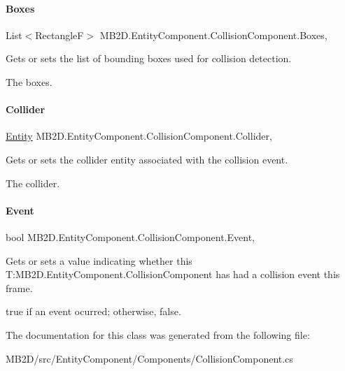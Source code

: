 \paragraph{\texorpdfstring{Boxes}{Boxes}}
{\footnotesize\ttfamily List$<$RectangleF$>$ M\+B2\+D.\+Entity\+Component.\+Collision\+Component.\+Boxes\hspace{0.3cm}{\ttfamily [get]}, {\ttfamily [set]}}



Gets or sets the list of bounding boxes used for collision detection. 

The boxes.\hypertarget{class_m_b2_d_1_1_entity_component_1_1_collision_component_aac8e61b6e669a4451fb2e8859827b47a}{}\label{class_m_b2_d_1_1_entity_component_1_1_collision_component_aac8e61b6e669a4451fb2e8859827b47a} 
\paragraph{\texorpdfstring{Collider}{Collider}}
{\footnotesize\ttfamily \hyperlink{class_m_b2_d_1_1_entity_component_1_1_entity}{Entity} M\+B2\+D.\+Entity\+Component.\+Collision\+Component.\+Collider\hspace{0.3cm}{\ttfamily [get]}, {\ttfamily [set]}}



Gets or sets the collider entity associated with the collision event. 

The collider.\hypertarget{class_m_b2_d_1_1_entity_component_1_1_collision_component_ad393ea9f0115ee346e469e5c335da26d}{}\label{class_m_b2_d_1_1_entity_component_1_1_collision_component_ad393ea9f0115ee346e469e5c335da26d} 
\paragraph{\texorpdfstring{Event}{Event}}
{\footnotesize\ttfamily bool M\+B2\+D.\+Entity\+Component.\+Collision\+Component.\+Event\hspace{0.3cm}{\ttfamily [get]}, {\ttfamily [set]}}



Gets or sets a value indicating whether this T\+:\+M\+B2\+D.\+Entity\+Component.\+Collision\+Component has had a collision event this frame. 

{\ttfamily true} if an event ocurred; otherwise, {\ttfamily false}.

The documentation for this class was generated from the following file\+:\begin{DoxyCompactItemize}
\item 
M\+B2\+D/src/\+Entity\+Component/\+Components/Collision\+Component.\+cs\end{DoxyCompactItemize}
